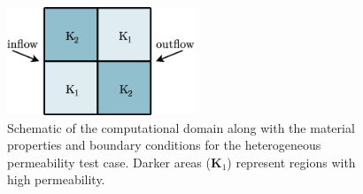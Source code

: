 \documentclass[times]{fldauth}
\begin{document}
\begin{figure}[h!]
  \begin{center}
    \includegraphics[width=0.5\textwidth]{4Rregion_BLv2}
    \caption{Schematic of the computational domain along with the
      material properties and boundary conditions for the
      heterogeneous permeability test case. Darker areas
      ($\mathbf{K}_\text{1}$) represent regions with high
      permeability. \label{fig:4reg_BL_schematic}}
  \end{center}
\end{figure}
\end{document}
